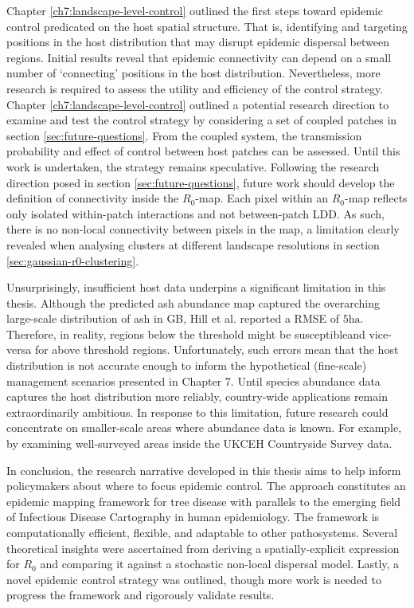 Chapter \ref{ch7:landscape-level-control} outlined the first steps toward epidemic control predicated on the host spatial structure.
That is, identifying and targeting positions in the host distribution that may disrupt epidemic dispersal between regions.
Initial results reveal that epidemic connectivity can depend on a small number of `connecting' positions in the host distribution.
Nevertheless, more research is required to assess the utility and efficiency of the control strategy. Chapter \ref{ch7:landscape-level-control}
outlined a potential research direction to examine and test the control strategy by considering a set of coupled patches in section \ref{sec:future-questions}.
From the coupled system,  the transmission probability and effect of control between host patches can be assessed.
Until this work is undertaken, the strategy remains speculative.
Following the research direction posed in section \ref{sec:future-questions}, future work should develop the definition of connectivity inside the $R_0$-map. Each pixel within an $R_0$-map reflects only isolated within-patch interactions and not between-patch LDD.
As such, there is no non-local connectivity between pixels in the map, 
a limitation clearly revealed when analysing clusters at different landscape resolutions in section \ref{sec:gaussian-r0-clustering}.

Unsurprisingly, insufficient host data underpins a significant limitation in this thesis.
Although the predicted ash abundance map captured the overarching large-scale distribution of ash in GB, Hill et al. reported a RMSE of $5\mathrm{ha}$. Therefore, in reality, regions below the threshold might be susceptible\textemdash and vice-versa for above threshold regions.
Unfortunately, such errors mean that the host distribution is not accurate enough to inform the hypothetical (fine-scale) management scenarios presented in Chapter 7. Until species abundance data captures the host distribution more reliably, country-wide applications remain extraordinarily ambitious. In response to this limitation, future research could concentrate on smaller-scale areas where abundance data is known. For example, by examining well-surveyed areas inside the UKCEH Countryside Survey data.

In conclusion, the research narrative developed in this thesis aims to help inform policymakers about where to focus epidemic control.
The approach constitutes an epidemic mapping framework for tree disease with parallels to the emerging field of Infectious Disease Cartography in human epidemiology. 
The framework is computationally efficient, flexible, and adaptable to other pathosystems.
Several theoretical insights were ascertained from deriving a spatially-explicit expression for $R_0$ and comparing it against a stochastic non-local dispersal model. Lastly, a novel epidemic control strategy was outlined, though more work is needed to progress the framework and rigorously validate results.

